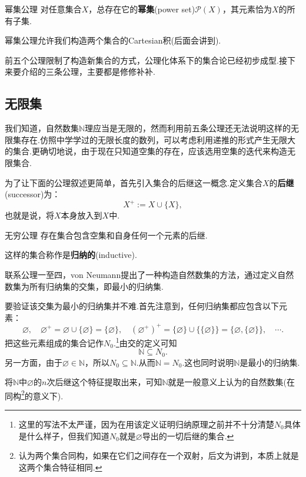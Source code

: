 \documentclass[lang=cn, zihao=5]{elegantbook}
\begin{document}
\begin{axiom}{幂集公理}
	对任意集合$X$，总存在它的\textbf{幂集}(power set)$\mathcal{P}(X)$，其元素恰为$X$的所有子集.
\end{axiom}

幂集公理允许我们构造两个集合的Cartesian积(后面会讲到).

前五个公理限制了构造新集合的方式，公理化体系下的集合论已经初步成型.接下来要介绍的三条公理，主要都是修修补补.

\subsection{无限集}

我们知道，自然数集$\mathbb{N}$理应当是无限的，然而利用前五条公理还无法说明这样的无限集存在.仿照中学学过的无限长度的数列，可以考虑利用递推的形式产生无限大的集合.更确切地说，由于现在只知道空集的存在，应该选用空集的迭代来构造无限集合.

为了让下面的公理叙述更简单，首先引入集合的后继这一概念.定义集合$X$的\textbf{后继}(successor)为：$$X^{+} := X \cup \{ X \},$$
也就是说，将$X$本身放入到$X$中.

\begin{axiom}{无穷公理}
	存在集合包含空集和自身任何一个元素的后继.
\end{axiom}
\begin{remark}
	这样的集合称作是\textbf{归纳的}(inductive).
\end{remark}

联系公理一至四，von Neumann提出了一种构造自然数集的方法，通过定义自然数集为所有归纳集的交集，即最小的归纳集.

要验证该交集为最小的归纳集并不难.首先注意到，任何归纳集都应包含以下元素：$$\varnothing ,\quad \varnothing ^{+}=\varnothing \cup \{ \varnothing \}=\{ \varnothing \} ,\quad (\varnothing ^{+})^{+} = \{ \varnothing \} \cup \{ \{ \varnothing \} \} = \{ \varnothing , \{ \varnothing \}\} ,\quad \cdots .$$
把这些元素组成的集合记作$N_0$.\footnote{这里的写法不太严谨，因为在用该定义证明归纳原理之前并不十分清楚$N_0$具体是什么样子，但我们知道$N_0$就是$\varnothing$导出的一切后继的集合.}由交的定义可知$$\mathbb{N} \subseteq N_0.$$
另一方面，由于$\varnothing \in \mathbb{N}$，所以$N_0 \subseteq \mathbb{N}$.从而$\mathbb{N} = N_0$.这也同时说明$\mathbb{N}$是最小的归纳集.

将$\mathbb{N}$中$\varnothing$的$n$次后继这个特征提取出来，可知$\mathbb{N}$就是一般意义上认为的自然数集(在同构\footnote{认为两个集合同构，如果在它们之间存在一个双射，后文为讲到，本质上就是这两个集合特征相同.}的意义下).
\end{document}
